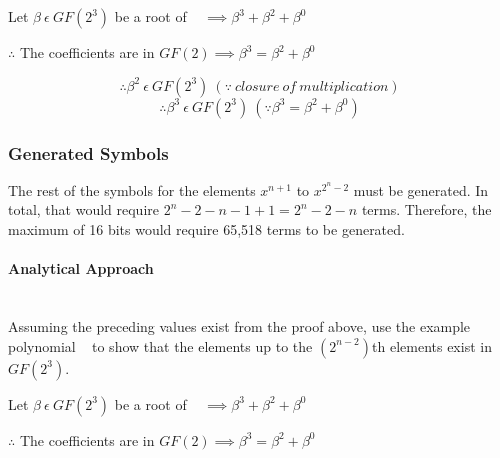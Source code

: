         \hspace*{\fill}
        \centerline{Let $\beta \ \epsilon \ GF(2^{3})$ be a root of
        \examplepoly~ $\implies \beta^{3} + \beta^{2} + \beta^{0}$}
        \hspace*{\fill}
        \centerline{$\therefore$ The coefficients are in $GF(2) \implies
        \beta^{3} = \beta^{2} + \beta^{0}$}
        \[ \therefore \beta^{2} \ \epsilon \ GF(2^{3}) \ (\because \ closure \
        of \ multiplication) \]
        \[ \therefore \beta^{3} \ \epsilon \ GF(2^{3}) \ (\because \beta^{3} =
        \beta^{2} + \beta^{0}) \]

    \subsubsection{Generated Symbols} The rest of the symbols for the elements
    $x^{n+1}$ to $x^{2^{n}-2}$ must be generated. In total, that would require
    $2^{n}-2-n-1+1=2^{n}-2-n$ terms. Therefore, the maximum of 16 bits would
    require 65,518 terms to be generated.

        \paragraph{Analytical Approach} \leavevmode \\ Assuming the preceding
        values exist from the proof above, use the example polynomial
        \examplepoly~ to show that the elements up to the $(2^{n-2})$th
        elements exist in $GF(2^{3})$.

        \hspace*{\fill}
        \centerline{Let $\beta \ \epsilon \ GF(2^{3})$ be a root of
        \examplepoly~ $\implies \beta^{3} + \beta^{2} + \beta^{0}$}
        \hspace*{\fill}
        \centerline{$\therefore$ The coefficients are in $GF(2) \implies
        \beta^{3} = \beta^{2} + \beta^{0}$}

